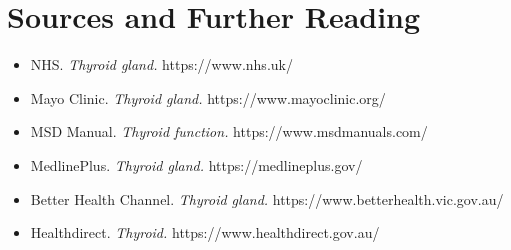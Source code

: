 \section*{Sources and Further Reading}
\begin{itemize}
    \item NHS. \textit{Thyroid gland.} https://www.nhs.uk/
    \item Mayo Clinic. \textit{Thyroid gland.} https://www.mayoclinic.org/
    \item MSD Manual. \textit{Thyroid function.} https://www.msdmanuals.com/
    \item MedlinePlus. \textit{Thyroid gland.} https://medlineplus.gov/
    \item Better Health Channel. \textit{Thyroid gland.} https://www.betterhealth.vic.gov.au/
    \item Healthdirect. \textit{Thyroid.} https://www.healthdirect.gov.au/
\end{itemize}
